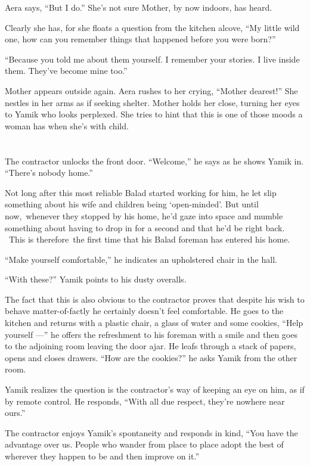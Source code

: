\documentclass[twoside,11pt]{book}
\begin{document}
Aera says, ``But I do.'' She's not sure Mother, by now indoors, has heard.

Clearly she has, for she floats a question from the kitchen alcove, ``My little wild one, how can you
remember things that happened before you were born?''

``Because you told me about them yourself. I remember your stories. I live inside them. They've become mine
too.''

Mother appears outside again. Aera rushes to her crying, ``Mother dearest!'' She nestles in
her arms as if seeking shelter. Mother holds her close, turning her eyes to Yamik who looks perplexed. She tries to hint
that this is one of those moods a woman has when she's with child.



\chapter{}

The contractor unlocks the front door. ``Welcome,'' he says as he shows Yamik in.
``There's nobody home.''

Not long after this most reliable Balad started working for him, he let slip something about his wife and children
being `open-minded{}'. But until now,~whenever they stopped by his home, he'd gaze into space and mumble something
about having to drop in for a second and that he'd be right back. ~This is therefore~the first time that his Balad
foreman has entered his home.

``Make yourself comfortable,'' he indicates an upholstered chair in the hall.

``With these?'' Yamik points to his dusty overalls.

The fact that this is also obvious to the contractor proves that despite his wish to behave matter-of-factly he certainly
doesn't feel comfortable. He goes to the kitchen and returns with a plastic chair, a glass of water and some cookies,
``Help yourself ---'' he offers the refreshment to his foreman with a smile and then goes to
the adjoining room leaving the door ajar. He leafs through a stack of papers, opens and closes
drawers. ``How are the cookies?'' he asks Yamik from the other room.

Yamik realizes the question is the contractor's way of keeping an eye on him,
as if by remote control. He responds,
``With all due respect, they're nowhere near ours.''

The contractor enjoys Yamik's spontaneity and responds in kind, ``You have the advantage over us. People
who wander from place to place adopt the best of wherever they happen to be and then improve on it.''
\end{document}
